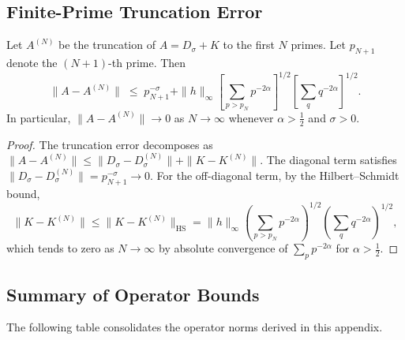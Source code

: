 \documentclass[11pt]{article}
\begin{document}
\subsection{Finite-Prime Truncation Error}
\label{sec:truncation}

\begin{theorem}
\label{thm:truncation}
Let $A^{(N)}$ be the truncation of $A=D_{\sigma}+K$
to the first $N$ primes.
Let $p_{N+1}$ denote the $(N{+}1)$-th prime.
Then
\[
\|A - A^{(N)}\| \;\leq\; p_{N+1}^{-\sigma}
+ \|h\|_{\infty}\!\left[\sum_{p>p_{N}}p^{-2\alpha}
\right]^{1/2}
\!\!\left[\sum_{q}q^{-2\alpha}\right]^{1/2}.
\]
In particular, $\|A-A^{(N)}\|\to 0$ as $N\to\infty$
whenever $\alpha>\tfrac{1}{2}$ and $\sigma>0$.
\end{theorem}

\begin{proof}
The truncation error decomposes as
$\|A-A^{(N)}\|\leq\|D_{\sigma}-D_{\sigma}^{(N)}\|+\|K-K^{(N)}\|$.
The diagonal term satisfies
$\|D_{\sigma}-D_{\sigma}^{(N)}\|=p_{N+1}^{-\sigma}\to 0$.
For the off-diagonal term, by the Hilbert--Schmidt bound,
\[
\|K-K^{(N)}\|
\leq\|K-K^{(N)}\|_{\mathrm{HS}}
=\|h\|_{\infty}\!\left(\sum_{p>p_{N}}p^{-2\alpha}\right)^{1/2}
\!\left(\sum_{q}q^{-2\alpha}\right)^{1/2},
\]
which tends to zero as $N\to\infty$ by absolute convergence
of $\sum_{p}p^{-2\alpha}$ for $\alpha>\frac{1}{2}$.
\end{proof}

\subsection{Summary of Operator Bounds}
\label{sec:summary}

The following table consolidates the operator norms derived in this appendix.
\end{document}
